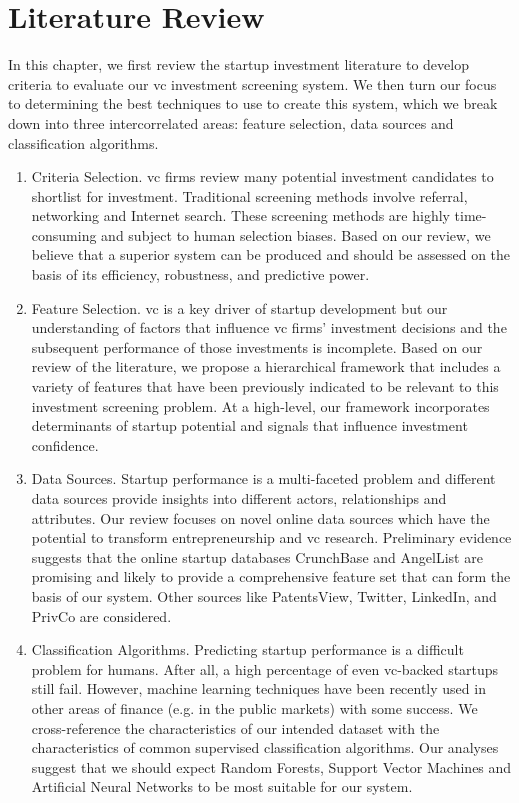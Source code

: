 \documentclass[../thesis/thesis.tex]{subfiles}
\begin{document}
\chapter{Literature Review}
\label{chap:litreview}


In this chapter, we first review the startup investment literature to develop criteria to evaluate our \gls{vc} investment screening system. We then turn our focus to determining the best techniques to use to create this system, which we break down into three intercorrelated areas: feature selection, data sources and classification algorithms.

\begin{enumerate}

\item Criteria Selection. \Gls{vc} firms review many potential investment candidates to shortlist for investment. Traditional screening methods involve referral, networking and Internet search. These screening methods are highly time-consuming and subject to human selection biases. Based on our review, we believe that a superior system can be produced and should be assessed on the basis of its efficiency, robustness, and predictive power.

\item Feature Selection. \Gls{vc} is a key driver of startup development but our understanding of factors that influence \gls{vc} firms' investment decisions and the subsequent performance of those investments is incomplete. Based on our review of the literature, we propose a hierarchical framework that includes a variety of features that have been previously indicated to be relevant to this investment screening problem. At a high-level, our framework incorporates determinants of startup potential and signals that influence investment confidence.

\item Data Sources. Startup performance is a multi-faceted problem and different data sources provide insights into different actors, relationships and attributes. Our review focuses on novel online data sources which have the potential to transform entrepreneurship and \gls{vc} research. Preliminary evidence suggests that the online startup databases CrunchBase and AngelList are promising and likely to provide a comprehensive feature set that can form the basis of our system. Other sources like PatentsView, Twitter, LinkedIn, and PrivCo are considered.

\item Classification Algorithms. Predicting startup performance is a difficult problem for humans. After all, a high percentage of even \gls{vc}-backed startups still fail. However, machine learning techniques have been recently used in other areas of finance (e.g. in the public markets) with some success. We cross-reference the characteristics of our intended dataset with the characteristics of common supervised classification algorithms. Our analyses suggest that we should expect Random Forests, Support Vector Machines and Artificial Neural Networks to be most suitable for our system.

\end{enumerate}
\end{document}
